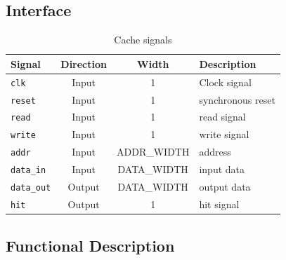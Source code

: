 \subsection{Interface}

\begin{table}[h!]
    \centering
    \begin{tabular}{|l|c|c|l|}
        \hline
        \textbf{Signal}     & \textbf{Direction} & \textbf{Width} & \textbf{Description}    \\ \hline
        \texttt{clk}        & Input              & 1              & Clock signal            \\ \hline
        \texttt{reset}      & Input              & 1              & synchronous reset       \\ \hline
        \texttt{read}       & Input              & 1              & read signal             \\ \hline
        \texttt{write}      & Input              & 1              & write signal            \\ \hline
        \texttt{addr}       & Input              & ADDR\_WIDTH    & address                 \\ \hline
        \texttt{data\_in}   & Input              & DATA\_WIDTH    & input data              \\ \hline
        \texttt{data\_out}  & Output             & DATA\_WIDTH    & output data             \\ \hline
        \texttt{hit}        & Output             & 1              & hit signal              \\ \hline
    \end{tabular}
    \caption{Cache signals}

\end{table}

\subsection{Functional Description}

